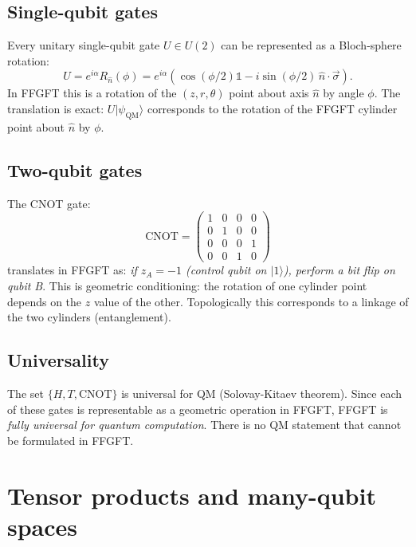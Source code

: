 \subsection{Single-qubit gates}

Every unitary single-qubit gate $U \in U(2)$ can be represented as a
Bloch-sphere rotation:
\begin{equation}
  U = e^{i\alpha} R_{\hat n}(\phi)
    = e^{i\alpha}(\cos(\phi/2)\mathbb{1} - i\sin(\phi/2)\, \hat n \cdot \vec\sigma).
\end{equation}
In FFGFT this is a rotation of the $(z, r, \theta)$ point about axis
$\hat n$ by angle $\phi$. The translation is exact: $U |\psi_\text{QM}\rangle$
corresponds to the rotation of the FFGFT cylinder point about $\hat n$
by $\phi$.

\subsection{Two-qubit gates}

The CNOT gate:
\begin{equation}
  \text{CNOT} = \begin{pmatrix}
    1 & 0 & 0 & 0 \\
    0 & 1 & 0 & 0 \\
    0 & 0 & 0 & 1 \\
    0 & 0 & 1 & 0
  \end{pmatrix}
\end{equation}
translates in FFGFT as: \emph{if $z_A = -1$ (control qubit on
$|1\rangle$), perform a bit flip on qubit B}. This is geometric
conditioning: the rotation of one cylinder point depends on the
$z$ value of the other. Topologically this corresponds to a
linkage of the two cylinders (entanglement).

\subsection{Universality}

The set $\{H, T, \text{CNOT}\}$ is universal for QM (Solovay-Kitaev
theorem). Since each of these gates is representable as a geometric
operation in FFGFT, FFGFT is \emph{fully universal for quantum
computation}. There is no QM statement that cannot be formulated in
FFGFT.

\section{Tensor products and many-qubit spaces}

